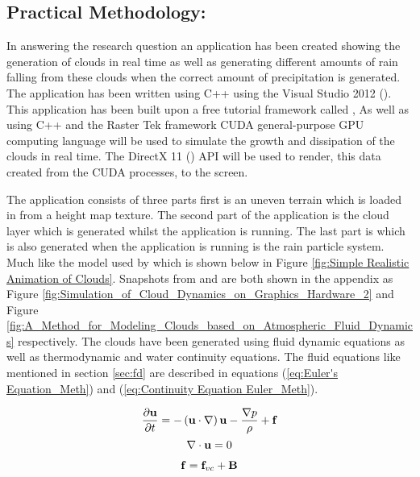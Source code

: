\subsection{Practical Methodology:}
In answering the research question an application has been created showing the generation of clouds in real time as well as generating different amounts of rain falling from these clouds when the correct amount of precipitation is generated.
The application has been written using C++ using the Visual Studio 2012 (\citeyear{visualstudio2013}).
This application has been built upon a free tutorial framework called \cite{Rastertek14},
As well as using C++ and the Raster Tek framework \cite{nvidia2013} CUDA general-purpose GPU computing language will be used to simulate the growth and dissipation of the clouds in real time.
The DirectX 11 (\citeyear{DirectX12}) API will be used to render, this data created from the CUDA processes, to the screen.

The application consists of three parts first is an uneven terrain which is loaded in from a height map texture. The second part of the application is the cloud layer which is generated whilst the application is running. The last part is which is also generated when the application is running is the rain particle system. 
Much like the model used by \citet{DobashiEtAl00} which is shown below in Figure \ref{fig:Simple Realistic Animation of Clouds}. Snapshots from \citet{HarrisEtAl03} and \citet{Miyazaki01} are both shown in the appendix as Figure \ref{fig:Simulation_of_Cloud_Dynamics_on_Graphics_Hardware_2} and Figure \ref{fig:A_Method_for_Modeling_Clouds_based_on_Atmospheric_Fluid_Dynamics} respectively.
The clouds have been generated using fluid dynamic equations as well as thermodynamic and water continuity equations. The fluid equations like mentioned in section \ref{sec:fd} are described in equations (\ref{eq:Euler's Equation_Meth}) and (\ref{eq:Continuity Equation Euler_Meth}). 

\begin{equation} \label{eq:Euler's Equation_Meth}
  \centering
   \frac{\partial \mathbf{u}}{\partial t}=-\left(\mathbf{u}\cdot \nabla \right)\mathbf{u}-\frac{\nabla p}{\rho}+\mathbf{f}
\end{equation}
\begin{equation} \label{eq:Continuity Equation Euler_Meth}
  \centering
  \nabla\cdot\mathbf{u}=0
\end{equation}

\begin{equation} \label{eq:forces}
  \centering
  \mathbf{f} = \mathbf{f}_{vc} + \mathbf{B}
\end{equation}

